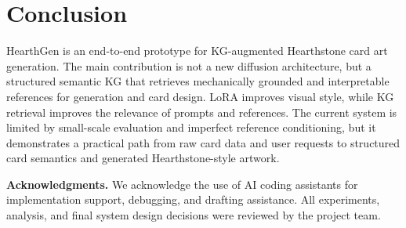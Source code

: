 \documentclass[10pt,twocolumn,letterpaper]{article}
\begin{document}
\section{Conclusion}

HearthGen is an end-to-end prototype for KG-augmented Hearthstone card art generation. The main contribution is not a new diffusion architecture, but a structured semantic KG that retrieves mechanically grounded and interpretable references for generation and card design. LoRA improves visual style, while KG retrieval improves the relevance of prompts and references. The current system is limited by small-scale evaluation and imperfect reference conditioning, but it demonstrates a practical path from raw card data and user requests to structured card semantics and generated Hearthstone-style artwork.

\noindent
{\bf Acknowledgments.} We acknowledge the use of AI coding assistants for implementation support, debugging, and drafting assistance. All experiments, analysis, and final system design decisions were reviewed by the project team.


{\small


}
\end{document}
